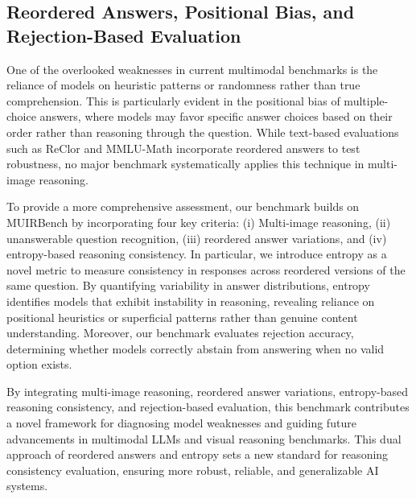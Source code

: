 \subsection{Reordered Answers, Positional Bias, and Rejection-Based Evaluation}
One of the overlooked weaknesses in current multimodal benchmarks is the reliance of models on heuristic patterns or randomness rather than true comprehension. This is particularly evident in the positional bias of multiple-choice answers, where models may favor specific answer choices based on their order rather than reasoning through the question. While text-based evaluations such as ReClor \cite{yu2020reclor} and MMLU-Math \cite{mathmmlu2023} incorporate reordered answers to test robustness, no major benchmark systematically applies this technique in multi-image reasoning.


To provide a more comprehensive assessment, our benchmark builds on MUIRBench by incorporating four key criteria: (i) Multi-image reasoning, (ii) unanswerable question recognition, (iii) reordered answer variations, and (iv) entropy-based reasoning consistency. In particular, we introduce entropy as a novel metric to measure consistency in responses across reordered versions of the same question. By quantifying variability in answer distributions, entropy identifies models that exhibit instability in reasoning, revealing reliance on positional heuristics or superficial patterns rather than genuine content understanding. Moreover, our benchmark evaluates rejection accuracy, determining whether models correctly abstain from answering when no valid option exists.

By integrating multi-image reasoning, reordered answer variations, entropy-based reasoning consistency, and rejection-based evaluation, this benchmark contributes a novel framework for diagnosing model weaknesses and guiding future advancements in multimodal LLMs and visual reasoning benchmarks. This dual approach of reordered answers and entropy sets a new standard for reasoning consistency evaluation, ensuring more robust, reliable, and generalizable AI systems.
